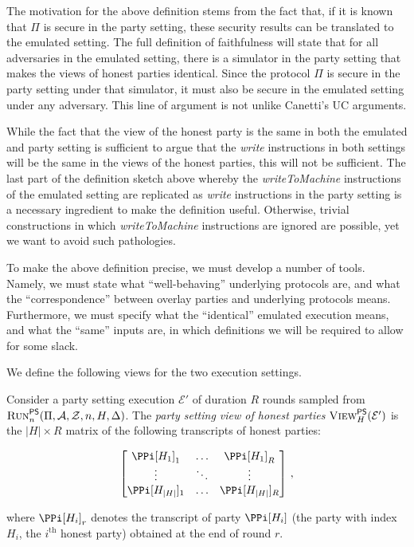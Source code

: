 The motivation for the above definition stems from the fact that, if it is known that
$\Pi$ is secure in the party setting, these security results can be translated to the
emulated setting. The full definition of faithfulness will state that for all adversaries
in the emulated setting, there is a simulator in the party setting that makes the
views of honest parties identical. Since the protocol $\Pi$ is secure in the party setting
under that simulator, it must also be secure in the emulated setting under any adversary.
This line of argument is not unlike Canetti's UC arguments.

While the fact that the view of the honest party is the same in both the emulated and
party setting is sufficient to argue that the \emph{write} instructions in both settings will
be the same in the views of the honest parties, this will not be sufficient.
The last part of the definition sketch above whereby the \emph{writeToMachine} instructions
of the emulated setting are replicated as \emph{write} instructions in the party setting
is a necessary ingredient to make the definition useful. Otherwise, trivial constructions
in which \emph{writeToMachine} instructions are ignored are possible, yet we want to avoid
such pathologies.

To make the above definition precise, we must develop a number of tools. Namely,
we must state what ``well-behaving'' underlying protocols are, and what the ``correspondence''
between overlay parties and underlying protocols means. Furthermore, we must specify
what the ``identical'' emulated execution means, and what the ``same'' inputs are,
in which definitions we will be required to allow for some slack.

We define the following views for the two execution settings.

\begin{definition}
  Consider a party setting execution $\mathcal{E}'$ of duration $R$ rounds
  sampled from
  $\textsc{Run}^{\textsf{PS}}_n(\Pi,\allowbreak \mathcal{A},\allowbreak \mathcal{Z},\allowbreak n,\allowbreak H,\allowbreak \Delta)$.
  The \emph{party setting view of honest parties} $\textsc{View}^{\textsf{PS}}_H(\mathcal{E}')$
  is the $|H|\times R$ matrix of the following transcripts of honest parties:

  \[
  \begin{bmatrix}
    \PPi[H_1]_1 &\ldots& \PPi[H_1]_R\\
         \vdots &\ddots& \vdots     \\
    \PPi[H_{|H|}]_1 &\ldots& \PPi[H_{|H|}]_R
  \end{bmatrix}\,,
  \]

  where $\PPi[H_i]_r$ denotes the transcript of party $\PPi[H_i]$
  (the party with index $H_i$, the $i^\text{th}$ honest party)
  obtained at the end of round $r$.
\end{definition}

